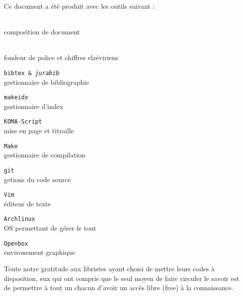 
\newcommand\colophon[2]{\par\texttt{#1}\\ #2\medskip}

\cleardoublepage
\thispagestyle{empty}
\begin{center}
\small
Ce document a été produit avec les outils suivant :

\begin{multicols}{2}
\par\LaTeXe{}\\ composition de document\medskip
\par\MF{}\\ fondeur de police et chiffres elzéviriens\medskip
\colophon{bibtex \& \emph{jurabib}}{gestionnaire de bibliographie}
\colophon{makeidx}{gestionnaire d'index}
\colophon{KOMA-Script}{mise en page et titraille}
\colophon{Make}{gestionnaire de compilation}
\colophon{git}{getions du code source}
\colophon{Vim}{éditeur de texte}
\colophon{Archlinux}{OS permettant de gérer le tout}
\colophon{Openbox}{environement graphique}
\end{multicols}

\bigskip

Toute notre gratitude aux libristes ayant choisi de mettre leurs codes à disposition,
eux qui ont compris que le seul moyen de faire circuler le savoir est de permettre
à tout un chacun d'avoir un accès libre (free) à la connaissance.

\bigskip\bigskip

\end{center}

